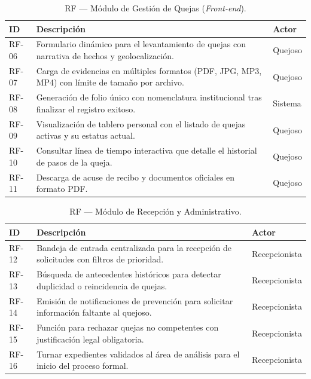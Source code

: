 \documentclass[12pt, oneside, letterpaper]{book}
\begin{document}
\begin{table}[H]
\centering
\caption{RF — Módulo de Gestión de Quejas (\textit{Front-end}).}
\begin{tabularx}{\textwidth}{@{} l L l @{}}
\toprule
{}
\textbf{\color{white} ID} & \textbf{\color{white} Descripción} & \textbf{\color{white} Actor} \\ \midrule
{}
RF-06 & Formulario dinámico para el levantamiento de quejas con narrativa de hechos y geolocalización. & Quejoso \\
RF-07 & Carga de evidencias en múltiples formatos (PDF, JPG, MP3, MP4) con límite de tamaño por archivo. & Quejoso \\
RF-08 & Generación de folio único con nomenclatura institucional tras finalizar el registro exitoso. & Sistema \\
RF-09 & Visualización de tablero personal con el listado de quejas activas y su estatus actual. & Quejoso \\
RF-10 & Consultar línea de tiempo interactiva que detalle el historial de pasos de la queja. & Quejoso \\
RF-11 & Descarga de acuse de recibo y documentos oficiales en formato PDF. & Quejoso \\ \bottomrule
\end{tabularx}
\end{table}

\begin{table}[H]
\centering
\caption{RF — Módulo de Recepción y Administrativo.}
\begin{tabularx}{\textwidth}{@{} l L l @{}}
\toprule
{}
\textbf{\color{white} ID} & \textbf{\color{white} Descripción} & \textbf{\color{white} Actor} \\ \midrule
{}
RF-12 & Bandeja de entrada centralizada para la recepción de solicitudes con filtros de prioridad. & Recepcionista \\
RF-13 & Búsqueda de antecedentes históricos para detectar duplicidad o reincidencia de quejas. & Recepcionista \\
RF-14 & Emisión de notificaciones de prevención para solicitar información faltante al quejoso. & Recepcionista \\
RF-15 & Función para rechazar quejas no competentes con justificación legal obligatoria. & Recepcionista \\
RF-16 & Turnar expedientes validados al área de análisis para el inicio del proceso formal. & Recepcionista \\ \bottomrule
\end{tabularx}
\end{table}
\end{document}
